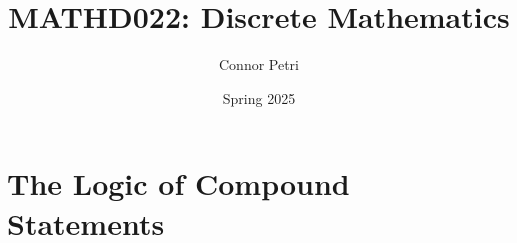 \documentclass[12pt, letterpaper]{article}
\title{MATHD022: Discrete Mathematics}
\author{Connor Petri}
\date{Spring 2025}
\begin{document}
\maketitle
\pagebreak
\tableofcontents
\pagebreak





\section{The Logic of Compound Statements}

\end{document}
